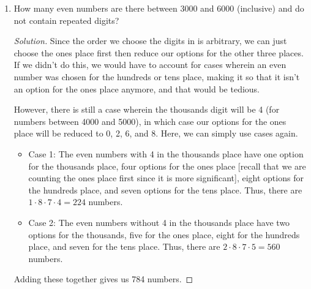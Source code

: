 \documentclass{article}
\newenvironment{solution}
  {\renewcommand\qedsymbol{$\blacksquare$}\begin{proof}[Solution]}
  {\end{proof}}
\begin{document}
\begin{enumerate}
\begin{solution}
        We can set aside 6000 for now since it's the only one with a 6 in the thousands place, then consider 3, 4, and 5 for the thousands place, 0 to 9 for the hundreds and tens places, and 0, 2, 4, 6, and 8 
        for the ones places, since a number has to end with these digits to be even. Once we multiply these, we simply add one case to count 6000, since it's also even. Thus, we have $3 \cdot 10 \cdot 10 \cdot 5 + 1 = 1501$ numbers.\par 
        Alternatively, since integers are either even or odd, and are distributed equally across the number line, you could simply get the total amount of numbers between 3000 and 6000 (which is 3000 inclusive of 3000), divide it by 2 and add one 
        case for 6000, which also gives you 1501 numbers. 
    \end{solution} 
    \item How many even numbers are there between 3000 and 6000 (inclusive) and do not contain repeated digits?\begin{solution} 
        Since the order we choose the digits in is arbitrary, we can just choose the ones place first then reduce our options for the other three places. If we didn't do this, we would have to account for cases wherein 
        an even number was chosen for the hundreds or tens place, making it so that it isn't an option for the ones place anymore, and that would be tedious.\par 
        However, there is still a case wherein the thousands digit will be 4 (for numbers between 4000 and 5000), in which case our options for the ones place will be reduced to 0, 2, 6, and 8. Here, we can simply use cases again. 
        \begin{itemize} 
            \item Case 1: The even numbers with 4 in the thousands place have one option for the thousands place, four options for the ones place [recall that we are counting the ones place first since it is more significant], 
            eight options for the hundreds place, and seven options for the tens place. Thus, there are $1 \cdot 8 \cdot 7 \cdot 4 = 224$ numbers. 
            \item Case 2: The even numbers without 4 in the thousands place have two options for the thousands, five for the ones place, eight for the hundreds place, and seven for the tens place. Thus, there are $2 \cdot 8 \cdot 7 \cdot 5 = 560$ numbers. 
        \end{itemize} Adding these together gives us 784 numbers. 

\end{solution}
\end{enumerate}
\end{document}
